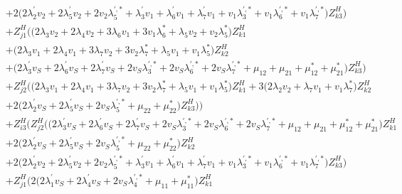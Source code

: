 \begin{align}
 &+2 \Big(2 \lambda^{\prime}_2 v_2  + 2 \lambda^{\prime}_5 v_2  + 2 v_2 \lambda^{{\prime},*}_5  + \lambda^{\prime}_3 v_1  + \lambda^{\prime}_6 v_1  + \lambda^{\prime}_7 v_1  + v_1 \lambda^{{\prime},*}_3  + v_1 \lambda^{{\prime},*}_6  + v_1 \lambda^{{\prime},*}_7 \Big)Z_{{k 3}}^{H} \Big)\nonumber \\ 
 &+Z_{{j 1}}^{H} \Big(\Big(2 \lambda_3 v_2  + 2 \lambda_4 v_2  + 3 \lambda_6 v_1  + 3 v_1 \lambda_6^*  + \lambda_5 v_2  + v_2 \lambda_5^* \Big)Z_{{k 1}}^{H} \nonumber \\ 
 &+\Big(2 \lambda_3 v_1  + 2 \lambda_4 v_1  + 3 \lambda_7 v_2  + 3 v_2 \lambda_7^*  + \lambda_5 v_1  + v_1 \lambda_5^* \Big)Z_{{k 2}}^{H} \nonumber \\ 
 &+\Big(2 \lambda^{\prime}_3 v_S  + 2 \lambda^{\prime}_6 v_S  + 2 \lambda^{\prime}_7 v_S  + 2 v_S \lambda^{{\prime},*}_3  + 2 v_S \lambda^{{\prime},*}_6  + 2 v_S \lambda^{{\prime},*}_7  + \mu_{12} + \mu_{21} + \mu_{12}^* + \mu_{21}^*\Big)Z_{{k 3}}^{H} \Big)\nonumber \\ 
 &+Z_{{j 2}}^{H} \Big(\Big(2 \lambda_3 v_1  + 2 \lambda_4 v_1  + 3 \lambda_7 v_2  + 3 v_2 \lambda_7^*  + \lambda_5 v_1  + v_1 \lambda_5^* \Big)Z_{{k 1}}^{H} +3 \Big(2 \lambda_2 v_2  + \lambda_7 v_1  + v_1 \lambda_7^* \Big)Z_{{k 2}}^{H} \nonumber \\ 
 &+2 \Big(2 \lambda^{\prime}_2 v_S  + 2 \lambda^{\prime}_5 v_S  + 2 v_S \lambda^{{\prime},*}_5  + \mu_{22} + \mu_{22}^*\Big)Z_{{k 3}}^{H} \Big)\Big)\nonumber \\ 
 &+Z_{{i 3}}^{H} \Big(Z_{{j 2}}^{H} \Big(\Big(2 \lambda^{\prime}_3 v_S  + 2 \lambda^{\prime}_6 v_S  + 2 \lambda^{\prime}_7 v_S  + 2 v_S \lambda^{{\prime},*}_3  + 2 v_S \lambda^{{\prime},*}_6  + 2 v_S \lambda^{{\prime},*}_7  + \mu_{12} + \mu_{21} + \mu_{12}^* + \mu_{21}^*\Big)Z_{{k 1}}^{H} \nonumber \\ 
 &+2 \Big(2 \lambda^{\prime}_2 v_S  + 2 \lambda^{\prime}_5 v_S  + 2 v_S \lambda^{{\prime},*}_5  + \mu_{22} + \mu_{22}^*\Big)Z_{{k 2}}^{H} \nonumber \\ 
 &+2 \Big(2 \lambda^{\prime}_2 v_2  + 2 \lambda^{\prime}_5 v_2  + 2 v_2 \lambda^{{\prime},*}_5  + \lambda^{\prime}_3 v_1  + \lambda^{\prime}_6 v_1  + \lambda^{\prime}_7 v_1  + v_1 \lambda^{{\prime},*}_3  + v_1 \lambda^{{\prime},*}_6  + v_1 \lambda^{{\prime},*}_7 \Big)Z_{{k 3}}^{H} \Big)\nonumber \\ 
 &+Z_{{j 1}}^{H} \Big(2 \Big(2 \lambda^{\prime}_1 v_S  + 2 \lambda^{\prime}_4 v_S  + 2 v_S \lambda^{{\prime},*}_4  + \mu_{11} + \mu_{11}^*\Big)Z_{{k 1}}^{H} \nonumber \\ 

\end{align}
